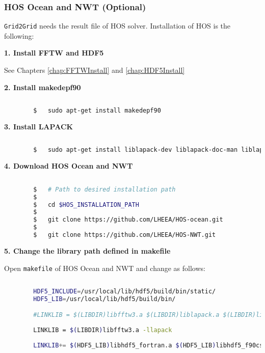 		
		\pagebreak
		\subsubsection{HOS Ocean and NWT (Optional)}
		
		\texttt{Grid2Grid} needs the result file of HOS solver. Installation of HOS is the following: 
		
		\vspace{1em}
		\textbf{1. Install FFTW and HDF5}
		
		See Chapters \ref{chap:FFTWInstall} and \ref{chap:HDF5Install}
		
		\vspace{1em}
		\textbf{2. Install makedepf90}
		
		\begin{lstlisting}[language=bash]		
		
		$	sudo apt-get install makedepf90		
		\end{lstlisting}
		
		\vspace{1em}
		\textbf{3. Install LAPACK}
		
		\begin{lstlisting}[language=bash]
		
		$	sudo apt-get install liblapack-dev liblapack-doc-man liblapack-doc liblapack-pic liblapack3 liblapack-test liblapack3gf liblapacke liblapacke-dev
		\end{lstlisting}
		
		\vspace{1em}
		\textbf{4. Download HOS Ocean and NWT}
		
		\begin{lstlisting}[language=bash]
		
		$	# Path to desired installation path
		$
		$	cd $HOS_INSTALLATION_PATH
		$
		$	git clone https://github.com/LHEEA/HOS-ocean.git
		$
		$	git clone https://github.com/LHEEA/HOS-NWT.git		
		\end{lstlisting}
		
		\vspace{1em}
		\textbf{5. Change the library path defined in makefile}
		
		Open \texttt{makefile} of HOS Ocean and NWT and change as follows: 
		
		\begin{lstlisting}[language=bash]
		
		HDF5_INCLUDE=/usr/local/lib/hdf5/build/bin/static/
		HDF5_LIB=/usr/local/lib/hdf5/build/bin/

		#LINKLIB = $(LIBDIR)libfftw3.a $(LIBDIR)liblapack.a $(LIBDIR)librefblas.a
		
		LINKLIB = $(LIBDIR)libfftw3.a -llapack
		
		LINKLIB+= $(HDF5_LIB)libhdf5_fortran.a $(HDF5_LIB)libhdf5_f90cstub.a $(HDF5_LIB)libhdf5.a $(HDF5_LIB)libszip.a $(HDF5_LIB)libz.a -ldl -pthread
		
		\end{lstlisting}
		
